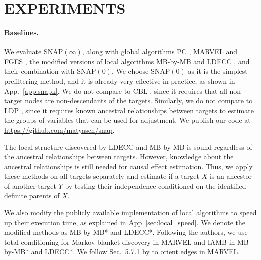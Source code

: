 \section{EXPERIMENTS}
\label{sec:experiments}

\paragraph{Baselines.} We evaluate \ac{SNAP}$(\infty)$, along with global algorithms PC \citep{spirtes2000causation}, MARVEL \citep{mokhtarian2021recursive} and FGES \citep{ramsey2017million}, the modified versions of local algorithms MB-by-MB \citep{wang2014discovering} and LDECC \citep{gupta2023local},  
and their combination with \ac{SNAP}$(0)$.
We choose \ac{SNAP}$(0)$ as it is the simplest prefiltering method, and it is already very effective in practice, as shown in App.~\ref{app:snapk}.
We do not compare to CBL \citep{watson2022causal}, since it requires that all non-target nodes are non-descendants of the targets.
Similarly, we do not compare to LDP \citep{maasch2024local}, since it requires known ancestral relationships between targets to estimate the groups of variables that can be used for adjustment.
We publish our code at \url{https://github.com/matyasch/snap}.

The local structure discovered by LDECC and MB-by-MB is sound regardless of the ancestral relationships between targets.
However, knowledge about the ancestral relationships is still needed for causal effect estimation.
Thus, we apply these methods on all targets separately and estimate if a target $X$ is an ancestor of another target $Y$ by testing their independence conditioned on the identified definite parents of $X$.

We also modify the publicly available implementation of local algorithms to speed up their execution time, as explained in App~\ref{sec:local_speed}.
We denote the modified methods as MB-by-MB* and LDECC*.
Following the authors, we use total conditioning \citep{pellet2008using} for Markov blanket discovery in MARVEL and  IAMB \citep{tsamardinos2003algorithms} in MB-by-MB* and LDECC*.
We follow Sec.~5.7.1 by \citet{mokhtarian2024recursive} to orient edges in MARVEL.

